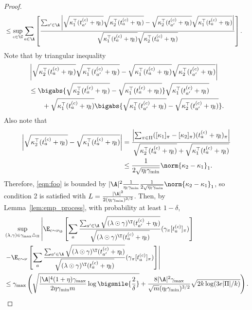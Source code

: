 \documentclass{article}
\newcommand{\1}{\mathbf{1}}
\begin{document}
\begin{lemma}
\begin{proof}
\begin{align}
    &\leq \sup_{c\in\C}\sum_{a \in \A} \left[\frac{\sum_{a'\in\A}\left|\sqrt{\kappa_1^{\top} (t_{a^{\prime}}^{(c)}+\eta_l)}\sqrt{\kappa_2^{\top} (t_{a}^{(c)}+\eta_l)}-\sqrt{\kappa_2^{\top} (t_{a'}^{(c)}+\eta_l)}\sqrt{\kappa_1^{\top} (t_{a}^{(c)}+\eta_l)}\right|}{\sqrt{\kappa_1^{\top} (t_{a}^{(c)}+\eta_l)}\sqrt{\kappa_2^{\top} (t_{a}^{(c)}+\eta_l)}}\right].\label{eqn:foo}
\end{align}
Note that by triangular inequality
\begin{align*}
    &\left|\sqrt{\kappa_2^{\top} (t_{a}^{(c)}+\eta_l)}\sqrt{\kappa_1^{\top} (t_{a^{\prime}}^{(c)}+\eta_l)}-\sqrt{\kappa_1^{\top} (t_{a}^{(c)}+\eta_l)}\sqrt{\kappa_2^{\top} (t_{a'}^{(c)}+\eta_l)}\right|\\
    &\leq\bigabs{\sqrt{\kappa_2^{\top} (t_{a}^{(c)}+\eta_l)}-\sqrt{\kappa_1^{\top} (t_{a}^{(c)}+\eta_l)}}\sqrt{\kappa_1^{\top} (t_{a^{\prime}}^{(c)}+\eta_l)}\\
    &\qquad+\sqrt{\kappa_1^{\top} (t_{a}^{(c)}+\eta_l)}\bigabs{\sqrt{\kappa_1^{\top} (t_{a^{\prime}}^{(c)}+\eta_l)}-\sqrt{\kappa_2^{\top} (t_{a^{\prime}}^{(c)}+\eta_l)}}.
\end{align*}
Also note that 
\begin{align*}
    \left|\sqrt{\kappa_2^{\top} (t_{a}^{(c)}+\eta_l)}-\sqrt{\kappa_1^{\top} (t_{a}^{(c)}+\eta_l)}\right| &= \frac{\left|\sum_{\pi\in\Pi}([\kappa_1]_\pi-[\kappa_2]_\pi)(t_a^{(c)}+\eta_l)_\pi\right|}{\sqrt{\kappa_2^{\top} (t_{a}^{(c)}+\eta_l)}+\sqrt{\kappa_1^{\top} (t_{a}^{(c)}+\eta_l)}}\\
    &\leq \frac{1}{2\sqrt{\eta_l\gamma_{\min}}}\norm{\kappa_2-\kappa_1}_1.
\end{align*}
Therefore, \eqref{eqn:foo} is bounded by $|\A|^2\frac{1}{\eta_l\gamma_{\min}}\frac{1}{2\sqrt{\eta_l\gamma_{\min}}}\norm{\kappa_2-\kappa_1}_1$, so condition 2 is satisfied with $L=\frac{|\A|^2}{2(\eta_l\gamma_{\min})^{3/2}}$. Then, by Lemma~\ref{lem:emp_process}, with probability at least $1-\delta$, 
\begin{align*}
    &\sup_{(\lambda,\gamma)\in\gamma_{\max}\triangle_\Pi}\left|\E_{c\sim\nu_\D}\left[\sum_{a}\frac{\sum_{a'\in\A}\sqrt{(\lambda\odot\gamma)^\T (t_{a'}^{(c)}+\eta_l)}}{\sqrt{(\lambda\odot\gamma)^\T (t_{a}^{(c)}+\eta_l)}}(\gamma_\pi[t_a^{(c)}]_\pi)\right]\right.\\
    &\left.-\E_{c\sim\nu}\left[\sum_{a}\frac{\sum_{a'\in\A}\sqrt{(\lambda\odot\gamma)^\T (t_{a'}^{(c)}+\eta_l)}}{\sqrt{(\lambda\odot\gamma)^\T (t_{a}^{(c)}+\eta_l)}}(\gamma_\pi[t_a^{(c)}]_\pi)\right]\right|\\
    &\leq \gamma_{\max}\left(\sqrt{\frac{|\A|^4(1+\eta)\gamma_{\max}}{2\eta\gamma_{\min}m}\log\bigsmile{\frac{2}{\delta}}}+\frac{8|\A|^2\gamma_{\max}}{\sqrt{m}(\eta_l\gamma_{\min})^{3/2}}\sqrt{2k\log(3e|\Pi|/k)}\right).
\end{align*}
\end{proof}
\end{lemma}
\end{document}
